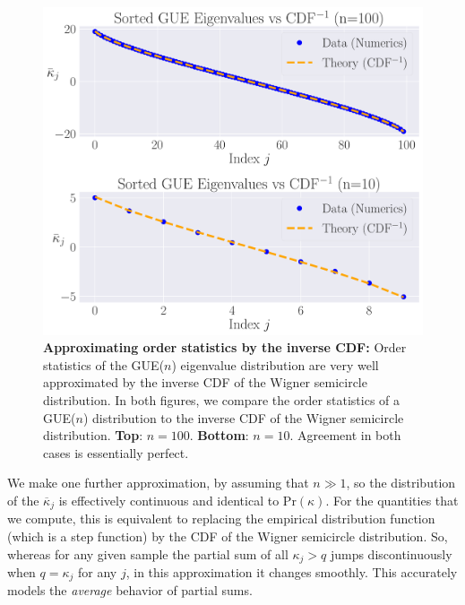 \documentclass[aps,pra, twocolumn]{revtex4-1}
\begin{document}
\begin{figure}[t]
\includegraphics[width=\columnwidth]{Images/Figure_8.pdf}
\caption{\textbf{Approximating order statistics by the inverse CDF:} Order statistics of the GUE($n$) eigenvalue distribution are very well approximated by the inverse CDF of the Wigner semicircle distribution.  In both figures, we compare the order statistics of a GUE($n$) distribution to the inverse CDF of the Wigner semicircle distribution. \textbf{Top}:  $n=100$.  \textbf{Bottom}:  $n=10$.
Agreement in both cases is essentially perfect.}
\label{fig:orderstatistics2}
\end{figure}

We make one further approximation, by assuming that $n\gg1$, so the distribution of the $\overline{\kappa}_j$ is effectively continuous and identical to $\mathrm{Pr}(\kappa)$. For the quantities that we compute, this is equivalent to replacing the empirical distribution function (which is a step function) by the CDF of the Wigner semicircle distribution.  So, whereas for any given sample the partial sum of all $\kappa_j > q$ jumps discontinuously when $q=\kappa_j$ for any $j$, in this approximation it changes smoothly.  This accurately models the \emph{average} behavior of partial sums.
\end{document}
